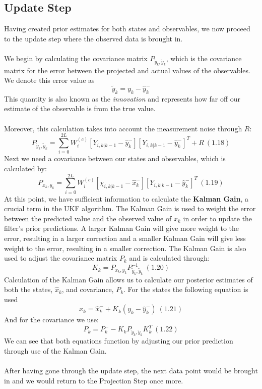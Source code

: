     \subsection{Update Step}
    Having created prior estimates for both states and observables, we now proceed to the update step where the observed data is brought in. \\
    \\
    We begin by calculating the covariance matrix $P_{\tilde{y}_k, \tilde{y}_k}$, which is the covariance matrix for the error between the projected and actual values of the observables. We denote this error value as 
    $$\tilde{y}_k = y_k - \hat{y}_k^-$$
    This quantity is also known as the \emph{innovation} and represents how far off our estimate of the observable is from the true value.\\
    \\
    Moreover, this calculation takes into account the measurement noise through $R$:
    $$ P_{\tilde{y}_k, \tilde{y}_k} = \sum_{i=0}^{2L} W_i^{(c)} [Y_{i,k|k-1} - \hat{y}_k^-][Y_{i,k|k-1} - \hat{y}_k^-]^T + R \ (1.18)$$
    Next we need a covariance between our states and observables, which is calculated by:
    $$ P_{{x}_k,{y}_k} = \sum_{i=0}^{2L} W_i^{(c)} [\chi_{i,k|k-1} - \hat{x}_k^-][Y_{i,k|k-1} - \hat{y}_k^-]^T \ (1.19)$$
    At this point, we have sufficient information to calculate the \textbf{Kalman Gain}, a crucial term in the UKF algorithm. The Kalman Gain is used to weight the error between the predicted value and the observed value of $x_k$ in order to update the filter's prior predictions. A larger Kalman Gain will give more weight to the error, resulting in a larger correction and a smaller Kalman Gain will give less weight to the error, resulting in a smaller correction. The Kalman Gain is also used to adjust the covariance matrix $P_k$ and is calculated through:
    $$K_k = P_{x_k, y_k} P_{\tilde{y}_k, \tilde{y}_k}^{-1} \ (1.20) $$
    Calculation of the Kalman Gain allows us to calculate our posterior estimates of both the states, $\hat{x}_k$, and covariance, $P_k$. For the states the following equation is used
    $$\hat{x}_k = \hat{x}_k^- + K_k(y_k - \hat{y}_k^-) \ (1.21)$$
    And for the covariance we use:
    $$ P_k = P_k^-  - K_k P_{\tilde{y}_k, \tilde{y}_k} K_k^T \ (1.22)$$
    We can see that both equations function by adjusting our prior prediction through use of the Kalman Gain.\\
    \\
    After having gone through the update step, the next data point would be brought in and we would return to the Projection Step once more.
